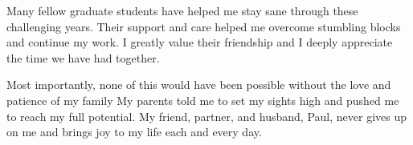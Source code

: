 \documentclass{ucbthesis}
\begin{document}
\begin{frontmatter}
\begin{acknowledgements}
Many fellow graduate students have helped me stay sane through these challenging years. Their support and care helped me overcome stumbling blocks and continue my work. I greatly value their friendship and I deeply appreciate the time we have had together.

Most importantly, none of this would have been possible without the love and patience of my family My parents told me to set my sights high and pushed me to reach my full potential. My friend, partner, and husband, Paul, never gives up on me and brings joy to my life each and every day.
\end{acknowledgements}

\end{frontmatter}



\pagestyle{headings}











\printbibliography

\appendix
 

\end{document}
